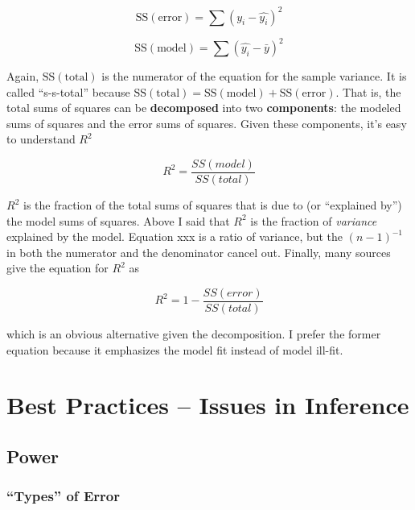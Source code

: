 \documentclass[]{book}
\begin{document}
\begin{equation}
\mathrm{SS(error)} = \sum{(y_i - \hat{y_i})^2}
\end{equation}

\begin{equation}
\mathrm{SS(model)} = \sum{(\hat{y_i} - \bar{y})^2}
\end{equation}

Again, \(\mathrm{SS(total)}\) is the numerator of the equation for the sample variance. It is called ``s-s-total'' because \(\mathrm{SS(total)} = \mathrm{SS(model)} + \mathrm{SS(error)}\). That is, the total sums of squares can be \textbf{decomposed} into two \textbf{components}: the modeled sums of squares and the error sums of squares. Given these components, it's easy to understand \(R^2\)

\begin{equation}
R^2 = \frac{SS(model)}{SS(total)}
\end{equation}

\(R^2\) is the fraction of the total sums of squares that is due to (or ``explained by'') the model sums of squares. Above I said that \(R^2\) is the fraction of \emph{variance} explained by the model. Equation xxx is a ratio of variance, but the \((n-1)^{-1}\) in both the numerator and the denominator cancel out. Finally, many sources give the equation for \(R^2\) as

\begin{equation}
R^2 = 1- \frac{SS(error)}{SS(total)}
\end{equation}

which is an obvious alternative given the decomposition. I prefer the former equation because it emphasizes the model fit instead of model ill-fit.

\hypertarget{best-practices-issues-in-inference}{%
\chapter{Best Practices -- Issues in Inference}\label{best-practices-issues-in-inference}}

\hypertarget{power}{%
\section{Power}\label{power}}

\hypertarget{types-of-error}{%
\subsection{``Types'' of Error}\label{types-of-error}}
\end{document}
